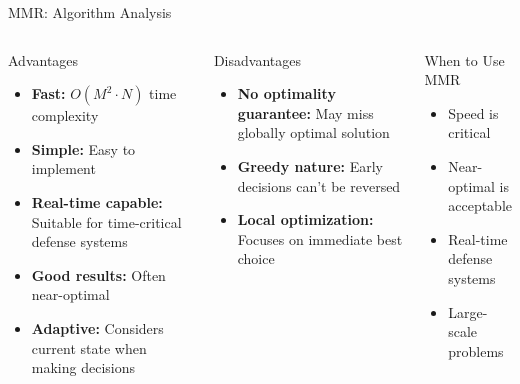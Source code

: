 \documentclass[aspectratio=43,8pt]{beamer}
\begin{document}
\begin{frame}{MMR: Algorithm Analysis}
\begin{columns}[t]
\begin{block}{Advantages}
\begin{itemize}
    \item \textbf{Fast:} $O(M^2 \cdot N)$ time complexity
    \item \textbf{Simple:} Easy to implement
    \item \textbf{Real-time capable:} Suitable for time-critical defense systems
    \item \textbf{Good results:} Often near-optimal
    \item \textbf{Adaptive:} Considers current state when making decisions
\end{itemize}
\end{block}

\begin{alertblock}{Disadvantages}
\begin{itemize}
    \item \textbf{No optimality guarantee:} May miss globally optimal solution
    \item \textbf{Greedy nature:} Early decisions can't be reversed
    \item \textbf{Local optimization:} Focuses on immediate best choice
\end{itemize}
\end{alertblock}

\begin{exampleblock}{When to Use MMR}
\begin{itemize}
    \item Speed is critical
    \item Near-optimal is acceptable
    \item Real-time defense systems
    \item Large-scale problems
\end{itemize}
\end{exampleblock}
\end{columns}
\end{frame}
\end{document}
